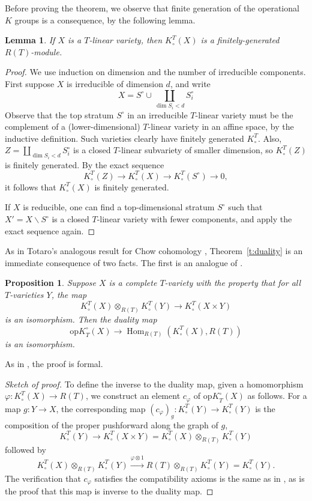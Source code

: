 \documentclass[11pt]{amsart}
\newtheorem{lemma}[theorem]{Lemma}
\newtheorem{proposition}[theorem]{Proposition}
\theoremstyle{definition}
\begin{document}
Before proving the theorem, we observe that finite generation of the operational $K$ groups is a consequence, by the following lemma.

\begin{lemma}\label{l.linear-fg}
If $X$ is a $T$-linear variety, then $K^T_\circ(X)$ is a finitely-generated $R(T)$-module.
\end{lemma}

\begin{proof}
We use induction on dimension and the number of irreducible components.  First suppose $X$ is irreducible of dimension $d$, and write
\[
  X = S^\circ \cup \coprod_{\dim S_i <d} S^\circ_i
\]
Observe that the top stratum $S^\circ$ in an irreducible $T$-linear variety must be the complement of a (lower-dimensional) $T$-linear variety in an affine space, by the inductive definition.  Such varieties clearly have finitely generated $K^T_\circ$.  Also, $Z=\coprod_{\dim S_i <d} S^\circ_i$ is a closed $T$-linear subvariety of smaller dimension, so $K^T_\circ(Z)$ is finitely generated.  By the exact sequence
\[
  K^T_\circ(Z) \to K^T_\circ(X) \to K^T_\circ(S^\circ) \to 0,
\]
it follows that $K^T_\circ(X)$ is finitely generated.

If $X$ is reducible, one can find a top-dimensional stratum $S^\circ$ such that $X' = X{\smallsetminus} S^\circ$ is a closed $T$-linear variety with fewer components, and apply the exact sequence again.
\end{proof}

As in Totaro's analogous result for Chow cohomology \cite{totaro}, Theorem~\ref{t:duality} is an immediate consequence of two facts.  The first is an analogue of \cite[Proposition~3]{fmss}.

\begin{proposition}\label{p.fmss}
Suppose $X$ is a complete $T$-variety with the property that for all $T$-varieties $Y$, the map
\[
  K^T_\circ(X) \otimes_{R(T)} K^T_\circ(Y) \to K^T_\circ(X\times Y)
\]
is an isomorphism.  Then the duality map
\[
{\mathrm{op}K}_T^\circ(X) \to \operatorname{Hom}_{R(T)}(K^T_\circ(X), R(T))
\]
is an isomorphism.
\end{proposition}

As in \cite{fmss}, the proof is formal.

\begin{proof}[Sketch of proof]
To define the inverse to the duality map, given a homomorphism ${\varphi}\colon K^T_\circ(X) \to R(T)$, we construct an element $c_{\varphi}$ of ${\mathrm{op}K}_T^\circ(X)$ as follows.  For a map $g\colon Y \to X$, the corresponding map $(c_{\varphi})_g\colon K^T_\circ(Y) \to K^T_\circ(Y)$ is the composition of the proper pushforward along the graph of $g$,
\[
  K^T_\circ(Y) \to K^T_\circ(X\times Y) = K^T_\circ(X)\otimes_{R(T)} K^T_\circ(Y)
\]
followed by
\[
K^T_\circ(X)\otimes_{R(T)} K^T_\circ(Y) \xrightarrow{{\varphi}\otimes 1} R(T) \otimes_{R(T)} K^T_\circ(Y) = K^T_\circ(Y).
\]
The verification that $c_{\varphi}$ satisfies the compatibility axioms is the same as in \cite{fmss}, as is the proof that this map is inverse to the duality map.
\end{proof}
\end{document}
